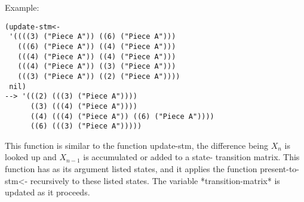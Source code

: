 \vspace{0.5cm}
\noindent Example:
\begin{verbatim}
(update-stm<-
 '((((3) ("Piece A")) ((6) ("Piece A")))
   (((6) ("Piece A")) ((4) ("Piece A")))
   (((4) ("Piece A")) ((4) ("Piece A")))
   (((4) ("Piece A")) ((3) ("Piece A")))
   (((3) ("Piece A")) ((2) ("Piece A"))))
 nil)
--> '(((2) (((3) ("Piece A"))))
      ((3) (((4) ("Piece A"))))
      ((4) (((4) ("Piece A")) ((6) ("Piece A"))))
      ((6) (((3) ("Piece A")))))
\end{verbatim}

\noindent This function is similar to the function
update-stm, the difference being $X_n$ is looked
up and $X_{n-1}$ is accumulated or added to a state-
transition matrix. This function has as its argument
listed states, and it applies the function
present-to-stm<- recursively to these listed states.
The variable *transition-matrix* is updated as it
proceeds.


























